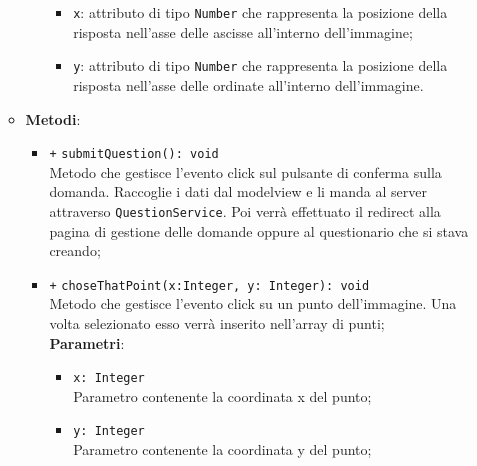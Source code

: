 \begin{itemize}
\begin{itemize}
\begin{itemize}
\begin{itemize}
					\item \texttt{x}: attributo di tipo \texttt{Number} che rappresenta la posizione della risposta nell'asse delle ascisse all'interno dell'immagine;
					\item \texttt{y}: attributo di tipo \texttt{Number} che rappresenta la posizione della risposta nell'asse delle ordinate all'interno dell'immagine.
				\end{itemize}
	\end{itemize}
	\item \textbf{Metodi}:
	\begin{itemize}
			\item \texttt{+} \texttt{submitQuestion(): void}\\ 
			Metodo che gestisce l’evento click sul pulsante di conferma sulla domanda. Raccoglie i dati dal modelview e li manda al server attraverso \texttt{QuestionService}. Poi verrà effettuato il redirect alla pagina di gestione delle domande oppure al questionario che si stava creando; 
			\item \texttt{+} \texttt{choseThatPoint(x:Integer, y: Integer): void}\\
			Metodo che gestisce l’evento click su un punto dell'immagine. Una volta selezionato esso verrà inserito nell'array di punti; \\
			\textbf{Parametri}:
			\begin{itemize}
				\item \texttt{x: Integer} \\
				Parametro contenente la coordinata x del punto;
				\item \texttt{y: Integer} \\ 
				Parametro contenente la coordinata y del punto;
			\end{itemize}
	\end{itemize}
\end{itemize}
\end{itemize}

